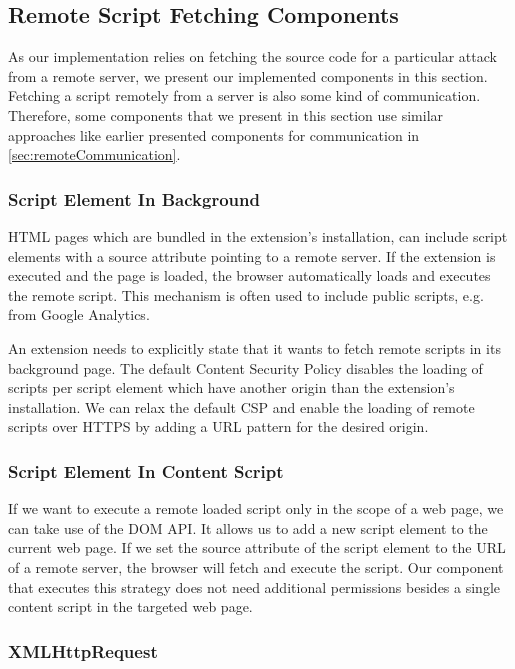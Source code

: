 \subsection{Remote Script Fetching Components}
	
	As our implementation relies on fetching the source code for a particular attack from a remote server, we present our implemented components in this section. Fetching a script remotely from a server is also some kind of communication. Therefore, some components that we present in this section use similar approaches like earlier presented components for communication in \autoref{sec:remoteCommunication}. 
	
\subsubsection{Script Element In Background}
\label{sec:scriptElementInBackground}
	
	HTML pages which are bundled in the extension's installation, can include script elements with a source attribute pointing to a remote server. If the extension is executed and the page is loaded, the browser automatically loads and executes the remote script. This mechanism is often used to include public scripts, e.g. from Google Analytics. 
	
	An extension needs to explicitly state that it wants to fetch remote scripts in its background page. The default Content Security Policy disables the loading of scripts per script element which have another origin than the extension's installation. We can relax the default CSP and enable the loading of remote scripts over HTTPS by adding a URL pattern for the desired origin. 
	
\subsubsection{Script Element In Content Script}
\label{sec:scriptElementInContentScript}

	If we want to execute a remote loaded script only in the scope of a web page, we can take use of the DOM API. It allows us to add a new script element to the current web page. If we set the source attribute of the script element to the URL of a remote server, the browser will fetch and execute the script. Our component that executes this strategy does not need additional permissions besides a single content script in the targeted web page. 
	
\subsubsection{XMLHttpRequest}
\label{sec:xhrFetching}


